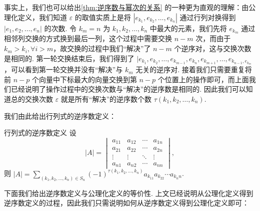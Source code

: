 事实上，我们也可以给出\autoref{thm:逆序数与幂次的关系} 的一种更为直观的理解：由公理化定义，我们知道 $\varepsilon$ 的取值实质上是将 $|e_{k_1}, e_{k_2}, \ldots, e_{k_n}|$ 通过行列对换得到 $|e_1, e_2, \ldots, e_n|$ 的次数. 令 $k_m = n$ 为 $k_1, k_2, \ldots, k_n$ 中最大的元素，我们先将 $e_{k_m}$ 通过相邻列交换的方式换到最后一列，这个过程中需要交换 $n - m$ 次，而由于 $k_m > k_i, \forall i > m$，故交换的过程中我们``解决''了 $n - m$ 个逆序对，这与交换次数是相同的. 第一轮交换结束后，我们得到了 $|e_{k_1}, e_{k_2}, \ldots, e_{k_{m-1}}, e_{k_n}, e_{k_{m+1}}, \ldots, e_{k_{n-1}, e_{k_m}}$，可以看到第一轮交换并没有``解决''与 $k_m$ 无关的逆序对. 接着我们只需要重复将前 $n-p$ 个向量中下标最大的向量交换到第 $n-p$ 个位置上的操作即可，而上面我们已经说明了操作过程中的交换次数与``解决''的逆序数是相同的. 因此我们可以知道总的交换次数 $\varepsilon$ 就是所有``解决''的逆序数个数 $\tau(k_1,k_2,\ldots,k_n)$.

我们由此给出行列式的逆序数定义：

\begin{theorem}{行列式的逆序数定义}{}
    设
    \[|A| = \begin{vmatrix}
            a_{11} & a_{12} & \cdots & a_{1n} \\
            a_{21} & a_{22} & \cdots & a_{2n} \\
            \vdots & \vdots & \ddots & \vdots \\
            a_{n1} & a_{n2} & \cdots & a_{nn}
        \end{vmatrix},\]
    则 $|A| = \sum\limits_{(k_1,k_2,\ldots,k_n) \in S_n} (-1)^{\tau(k_1,k_2,\ldots,k_n)}a_{k_11}a_{k_22}\cdots a_{k_nn}$.
\end{theorem}

下面我们给出逆序数定义与公理化定义的等价性. 上文已经说明从公理化定义得到逆序数定义的过程，因此我们只需说明如何从逆序数定义得到公理化定义即可：

